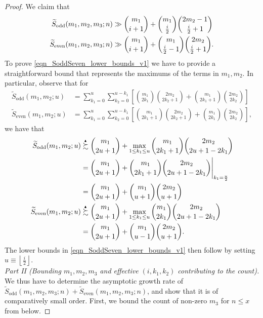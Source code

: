 \documentclass[11pt,reqno,a4letter]{article}
\numberwithin{figure}{section}
\numberwithin{table}{section}
\newcommand{\Floor}[2]{\ensuremath{\left\lfloor \frac{#1}{#2} \right\rfloor}}
\theoremstyle{plain}
\numberwithin{theorem}{section}
\theoremstyle{definition}
\newcommand{\SuccSim}[0]{\overset{_{\scriptsize{\blacktriangle}}}{\succsim}}
\begin{document}
\begin{proof}
We claim that 
\begin{align}
\label{eqn_SoddSeven_lower_bounds_v1} 
\widetilde{S}_{\operatorname{odd}}(m_1, m_2, m_3; n) & \gg 
     \binom{m_1}{i+1} + \binom{m_1}{\frac{i}{2}} \binom{2m_2-1}{\frac{i}{2}+1} \\ 
\notag 
\widetilde{S}_{\operatorname{even}}(m_1, m_2, m_3; n) & \gg 
     \binom{m_1}{i+1} + \binom{m_1}{\frac{i}{2}-1} \binom{2m_2}{\frac{i}{2}+1}. 
\end{align} 
To prove \eqref{eqn_SoddSeven_lower_bounds_v1} we have to provide a straightforward bound that 
represents the maximums of the terms in $m_1,m_2$. In particular, observe that for 
\begin{align*} 
\widetilde{S}_{\operatorname{odd}}(m_1, m_2; u) & = 
     \sum_{k_1=0}^{u} \sum_{k_2=0}^{u-k_1} \left[\binom{m_1}{2k_1} \binom{2m_2}{2k_2+1} + 
     \binom{m_1}{2k_1+1} \binom{2m_2}{2k_2}\right] \\ 
\widetilde{S}_{\operatorname{even}}(m_1, m_2; u) & = 
     \sum_{k_1=0}^{u} \sum_{k_2=0}^{u-k_1} \left[\binom{m_1}{2k_1+1} \binom{2m_2}{2k_2+1} + 
     \binom{m_1}{2k_1} \binom{2m_2}{2k_2}\right], 
\end{align*} 
we have that 
\begin{align*} 
\widetilde{S}_{\operatorname{odd}}(m_1, m_2; u) & \SuccSim \binom{m_1}{2u+1} + 
     \max_{1 \leq k_1 \leq u} \binom{m_1}{2k_1+1} \binom{2m_2}{2u+1-2k_1} \\ 
     & = \binom{m_1}{2u+1} + \binom{m_1}{2k_1+1} \binom{2m_2}{2u+1-2k_1} \Biggr\rvert_{k_1=\frac{u}{2}} \\ 
     & =  \binom{m_1}{2u+1} + \binom{m_1}{u+1} \binom{2m_2}{u+1} \\ 
\widetilde{S}_{\operatorname{even}}(m_1, m_2; u) & \SuccSim \binom{m_1}{2u+1} + 
     \max_{1 \leq k_1 \leq u} \binom{m_1}{2k_1} \binom{2m_2}{2u+1-2k_1} \\ 
     & = \binom{m_1}{2u+1} + \binom{m_1}{u-1} \binom{2m_2}{u+1}.  
\end{align*} 
The lower bounds in \eqref{eqn_SoddSeven_lower_bounds_v1} then follow by setting 
$u \equiv \Floor{i}{2}$. \\ 
\textit{Part II (Bounding $m_1,m_2,m_3$ and effective $(i, k_1, k_2)$ contributing to the count). } 
We thus have to determine the asymptotic growth rate of 
$\widetilde{S}_{\operatorname{odd}}(m_1, m_2, m_3; n) + \widetilde{S}_{\operatorname{even}}(m_1, m_2, m_3; n)$, 
and show that it is of comparatively small order. First, we bound the count of non-zero $m_3$ for 
$n \leq x$ from below. 

\end{proof}
\end{document}
